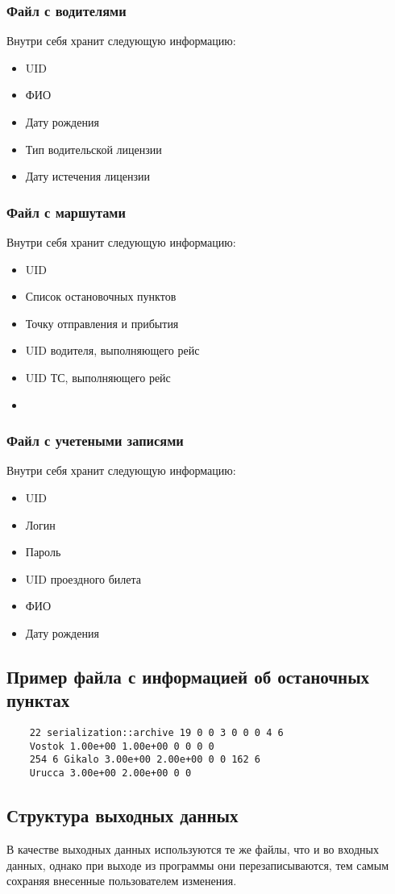 \subsubsection{Файл с водителями}
Внутри себя хранит следующую информацию:
\begin{itemize}
    \item UID
    \item ФИО
    \item Дату рождения
    \item Тип водительской лицензии
    \item Дату истечения лицензии
\end{itemize}

\subsubsection{Файл с маршутами}
Внутри себя хранит следующую информацию:
\begin{itemize}
    \item UID
    \item Список остановочных пунктов
    \item Точку отправления и прибытия
    \item UID водителя, выполняющего рейс
    \item UID ТС, выполняющего рейс
    \item 
\end{itemize}

\subsubsection{Файл с учетеными записями}
Внутри себя хранит следующую информацию:
\begin{itemize}
    \item UID
    \item Логин
    \item Пароль
    \item UID проездного билета
    \item ФИО
    \item Дату рождения
\end{itemize}

\subsection{Пример файла с информацией об останочных пунктах}
\begin{verbatim}
    22 serialization::archive 19 0 0 3 0 0 0 4 6 
    Vostok 1.00e+00 1.00e+00 0 0 0 0 
    254 6 Gikalo 3.00e+00 2.00e+00 0 0 162 6 
    Urucca 3.00e+00 2.00e+00 0 0
\end{verbatim}

\subsection{Структура выходных данных}
В качестве выходных данных используются те же файлы, что и во входных данных, однако при выходе из программы они перезаписываются, тем самым сохраняя внесенные пользователем изменения.

